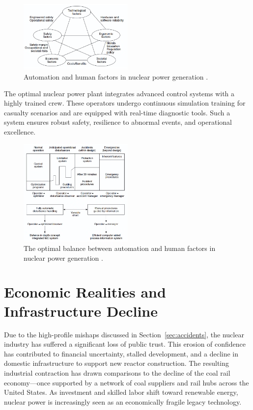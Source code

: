\documentclass[12pt]{article}
\begin{document}
\begin{figure}[H]
  \centering
  \includegraphics[width=0.5\textwidth]{automationfactors}
  \caption{Automation and human factors in nuclear power generation \autocite{moderninstruments}.}
  \label{fig:automationfactors}
\end{figure}

The optimal nuclear power plant integrates advanced control systems with a highly trained crew. These operators undergo continuous simulation training for casualty scenarios and are equipped with real-time diagnostic tools. Such a system ensures robust safety, resilience to abnormal events, and operational excellence.

\begin{figure}[H]
  \centering
  \includegraphics[width=0.5\textwidth]{optimalautomation.png}
  \caption{The optimal balance between automation and human factors in nuclear power generation \autocite{moderninstruments}.}
  \label{fig:optimalautomation}
\end{figure}
\section{Economic Realities and Infrastructure Decline}

Due to the high-profile mishaps discussed in Section~\ref{sec:accidents}, the nuclear industry has suffered a significant loss of public trust. This erosion of confidence has contributed to financial uncertainty, stalled development, and a decline in domestic infrastructure to support new reactor construction. The resulting industrial contraction has drawn comparisons to the decline of the coal rail economy—once supported by a network of coal suppliers and rail hubs across the United States. As investment and skilled labor shift toward renewable energy, nuclear power is increasingly seen as an economically fragile legacy technology.
\end{document}
